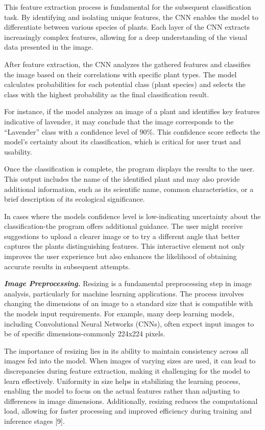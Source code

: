 \documentclass[
]{article}
\begin{document}
This feature extraction process is fundamental for the subsequent
classification task. By identifying and isolating unique features, the
CNN enables the model to differentiate between various species of
plants. Each layer of the CNN extracts increasingly complex features,
allowing for a deep understanding of the visual data presented in the
image.

After feature extraction, the CNN analyzes the gathered features and
classifies the image based on their correlations with specific plant
types. The model calculates probabilities for each potential class
(plant species) and selects the class with the highest probability as
the final classification result.

For instance, if the model analyzes an image of a plant and identifies
key features indicative of lavender, it may conclude that the image
corresponds to the ``Lavender'' class with a confidence level of 90\%.
This confidence score reflects the model's certainty about its
classification, which is critical for user trust and usability.

Once the classification is complete, the program displays the results to
the user. This output includes the name of the identified plant and may
also provide additional information, such as its scientific name, common
characteristics, or a brief description of its ecological significance.

In cases where the model\textquotesingle s confidence level is
low-indicating uncertainty about the classification-the program offers
additional guidance. The user might receive suggestions to upload a
clearer image or to try a different angle that better captures the
plant\textquotesingle s distinguishing features. This interactive
element not only improves the user experience but also enhances the
likelihood of obtaining accurate results in subsequent attempts.

\emph{\textbf{Image Preprocessing.}} Resizing is a fundamental
preprocessing step in image analysis, particularly for machine learning
applications. The process involves changing the dimensions of an image
to a standard size that is compatible with the model\textquotesingle s
input requirements. For example, many deep learning models, including
Convolutional Neural Networks (CNNs), often expect input images to be of
specific dimensions-commonly 224x224 pixels.

The importance of resizing lies in its ability to maintain consistency
across all images fed into the model. When images of varying sizes are
used, it can lead to discrepancies during feature extraction, making it
challenging for the model to learn effectively. Uniformity in size helps
in stabilizing the learning process, enabling the model to focus on the
actual features rather than adjusting to differences in image
dimensions. Additionally, resizing reduces the computational load,
allowing for faster processing and improved efficiency during training
and inference stages {[}9{]}.
\end{document}
